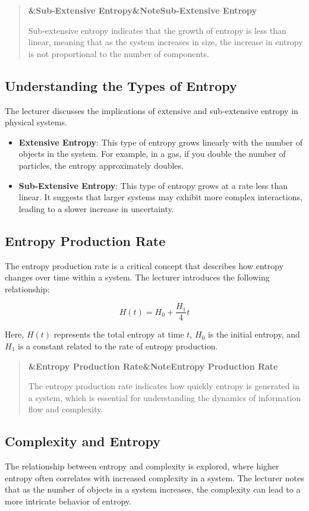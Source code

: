 \documentclass[a4paper]{article}
\newcommand{\boxheading}[1]{%
  \par\smallskip
  \noindent\textbf{\ifx&#1&Note\else#1\fi}\par
  \smallskip
}
\newenvironment{defbox}[1][]{%
  \begin{quote}\color{green!40!black}\boxheading{#1}\normalcolor
}{\end{quote}}
\newenvironment{rembox}[1][]{%
  \begin{quote}\color{black!70}\boxheading{#1}\normalcolor
}{\end{quote}}
\begin{document}
\begin{defbox}[Sub-Extensive Entropy]
Sub-extensive entropy indicates that the growth of entropy is less than linear, meaning that as the system increases in size, the increase in entropy is not proportional to the number of components.
\end{defbox}

\subsection{Understanding the Types of Entropy}
The lecturer discusses the implications of extensive and sub-extensive entropy in physical systems. 

\begin{itemize}
    \item \textbf{Extensive Entropy}: This type of entropy grows linearly with the number of objects in the system. For example, in a gas, if you double the number of particles, the entropy approximately doubles.
    \item \textbf{Sub-Extensive Entropy}: This type of entropy grows at a rate less than linear. It suggests that larger systems may exhibit more complex interactions, leading to a slower increase in uncertainty.
\end{itemize}

\subsection{Entropy Production Rate}
The entropy production rate is a critical concept that describes how entropy changes over time within a system. The lecturer introduces the following relationship:

\begin{equation}
H(t) = H_0 + \frac{H_1}{4} t
\end{equation}

Here, \( H(t) \) represents the total entropy at time \( t \), \( H_0 \) is the initial entropy, and \( H_1 \) is a constant related to the rate of entropy production. 

\begin{rembox}[Entropy Production Rate]
The entropy production rate indicates how quickly entropy is generated in a system, which is essential for understanding the dynamics of information flow and complexity.
\end{rembox}

\subsection{Complexity and Entropy}
The relationship between entropy and complexity is explored, where higher entropy often correlates with increased complexity in a system. The lecturer notes that as the number of objects in a system increases, the complexity can lead to a more intricate behavior of entropy.
\end{document}
